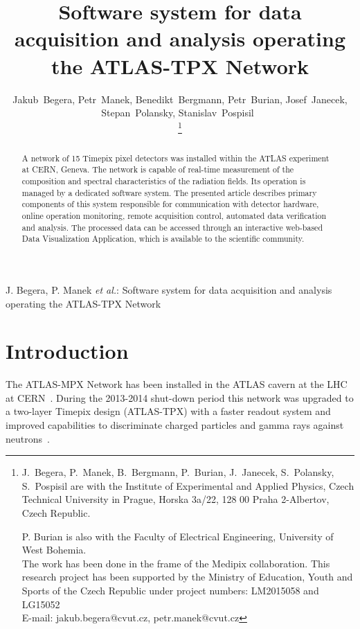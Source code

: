 \documentclass[journal]{IEEEtran}
\begin{document}
\title{Software system for data acquisition and analysis operating the ATLAS-TPX Network}

\author{Jakub~Begera, Petr~Manek, Benedikt~Bergmann, Petr~Burian, Josef~Janecek, Stepan~Polansky, Stanislav~Pospisil~

\thanks{J.~Begera, P.~Manek, B.~Bergmann, P.~Burian, J.~Janecek, S.~Polansky, S.~Pospisil are with the Institute of Experimental and Applied Physics, Czech Technical University in Prague, Horska 3a/22, 128 00 Praha 2-Albertov, Czech Republic.

P. Burian is also with the Faculty of Electrical Engineering, University of West Bohemia.\protect\\
The work has been done in the frame of the Medipix collaboration. This research project has been supported by the Ministry of Education, Youth and Sports of the Czech Republic under project numbers: LM2015058 and LG15052\protect\\
E-mail: jakub.begera@cvut.cz, petr.manek@cvut.cz}
}

\markboth{}%
{J. Begera, P. Manek \MakeLowercase{\textit{et al.}}: Software system for data acquisition and analysis operating the ATLAS-TPX Network}


\maketitle


\begin{abstract}
A network of 15 Timepix pixel detectors was installed within the ATLAS experiment at CERN, Geneva. The network is capable of real-time measurement of the composition and spectral characteristics of the radiation fields. Its operation is managed by a dedicated software system. The presented article describes primary components of this system responsible for communication with detector hardware, online operation monitoring, remote acquisition control, automated data verification and analysis. The processed data can be accessed through an interactive web-based Data Visualization Application, which is available to the scientific community.
\end{abstract}

\section{\label{sec:introduction}Introduction}
The ATLAS-MPX Network has been installed in the ATLAS cavern at the LHC at CERN~\cite{CampbellATLAS}. During the 2013-2014 shut-down period this network was upgraded to a two-layer Timepix design (ATLAS-TPX) with a faster readout system and improved capabilities to discriminate charged particles and gamma rays against neutrons~\cite{Proposal_Claude}.
\end{document}

